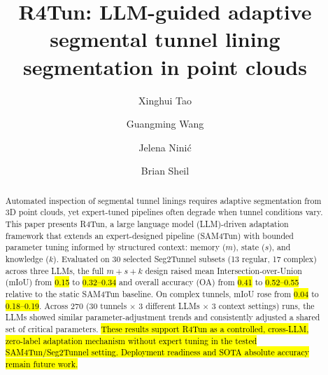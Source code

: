 \documentclass[a4paper,fleqn]{cas-dc}
\begin{document}
\let\WriteBookmarks\relax
\def\floatpagepagefraction{1}
\def\textpagefraction{.001}




{

\title[mode=title]{R4Tun: LLM-guided adaptive segmental tunnel lining segmentation in point clouds}

\author[1]{Xinghui Tao}

\author[1]{Guangming Wang}
\cormark[1]

\author[2]{Jelena Nini\'{c}}

\author[1]{Brian Sheil}






\begin{abstract}
Automated inspection of segmental tunnel linings requires adaptive segmentation from 3D point clouds, yet expert-tuned pipelines often degrade when tunnel conditions vary. This paper presents R4Tun, a large language model (LLM)-driven adaptation framework that extends an expert-designed pipeline (SAM4Tun) with bounded parameter tuning informed by structured context: memory ($m$), state ($s$), and knowledge ($k$). Evaluated on 30 selected Seg2Tunnel subsets (13 regular, 17 complex) across three LLMs, the full $m+s+k$ design raised mean Intersection-over-Union (mIoU) from \hl{0.15} to \hl{0.32--0.34} and overall accuracy (OA) from \hl{0.41} to \hl{0.52--0.55} relative to the static SAM4Tun baseline. On complex tunnels, mIoU rose from \hl{0.04} to \hl{0.18--0.19}. Across 270 (30 tunnels $\times$ 3 different LLMs $\times$ 3 context settings) runs, the LLMs showed similar parameter-adjustment trends and consistently adjusted a shared set of critical parameters. \hl{These results support R4Tun as a controlled, cross-LLM, zero-label adaptation mechanism without expert tuning in the tested SAM4Tun/Seg2Tunnel setting. Deployment readiness and SOTA absolute accuracy remain future work.}
\end{abstract}


}
\end{document}
